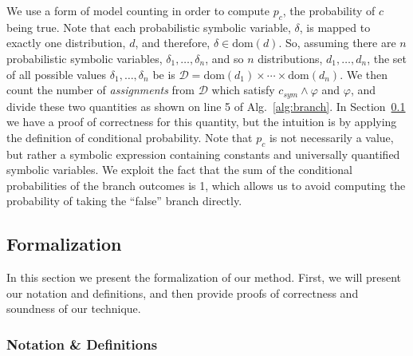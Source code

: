 \documentclass[acmsmall]{acmart}\settopmatter{}
\newcommand*\dom[1]{\mathrm{dom}\left( #1 \right)}
\begin{document}
	We use a form of model counting in order to compute $p_c$, the probability of $c$ being true.
	Note that each probabilistic symbolic variable, $\delta$, is mapped to exactly one distribution, $d$, and therefore, $\delta \in \dom{d}$.
	So, assuming there are $n$ probabilistic symbolic variables, $\delta_1,\ldots,\delta_n$, and so $n$ distributions, $d_1,\ldots,d_n$, the set of all possible values $\delta_1,\ldots,\delta_n$ be is $\mathcal{D} = \dom{d_1} \times \cdots \times \dom{d_n}$.
	We then count the number of \textit{assignments} from $\mathcal{D}$ which satisfy $c_{sym} \wedge \varphi$ and $\varphi$, and divide these two quantities as shown on line 5 of Alg.~\ref{alg:branch}.
	In Section~\ref{sec:formalization} we have a proof of correctness for this quantity, but the intuition is by applying the definition of conditional probability.
	Note that $p_c$ is not necessarily a value, but rather a symbolic expression containing constants and universally quantified symbolic variables.
	We exploit the fact that the sum of the conditional probabilities of the branch outcomes is 1, which allows us to avoid computing the probability of taking the ``false'' branch directly.
	
	\subsection{Formalization}
	\label{sec:formalization}
	
	In this section we present the formalization of our method. First, we will present our notation and definitions, and then provide proofs of correctness and soundness of our technique.
	
	\subsubsection{Notation \& Definitions}
	\label{sec:notation}
	
\end{document}
